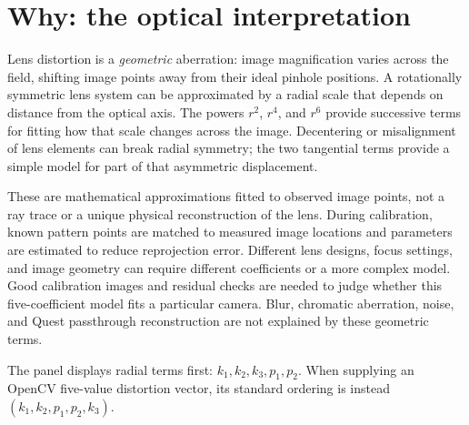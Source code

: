 \documentclass[11pt,a4paper]{article}
\begin{document}
\section{Why: the optical interpretation}
Lens distortion is a \emph{geometric} aberration: image magnification varies
across the field, shifting image points away from their ideal pinhole
positions. A rotationally symmetric lens system can be approximated by a
radial scale that depends on distance from the optical axis. The powers
$r^2$, $r^4$, and $r^6$ provide successive terms for fitting how that scale
changes across the image. Decentering or misalignment of lens elements can
break radial symmetry; the two tangential terms provide a simple model for
part of that asymmetric displacement.

These are mathematical approximations fitted to observed image points, not a
ray trace or a unique physical reconstruction of the lens. During calibration,
known pattern points are matched to measured image locations and parameters are
estimated to reduce reprojection error. Different lens designs, focus settings,
and image geometry can require different coefficients or a more complex model.
Good calibration images and residual checks are needed to judge whether this
five-coefficient model fits a particular camera. Blur, chromatic aberration,
noise, and Quest passthrough reconstruction are not explained by these
geometric terms.

The panel displays radial terms first: $k_1,k_2,k_3,p_1,p_2$. When supplying
an OpenCV five-value distortion vector, its standard ordering is instead
$(k_1,k_2,p_1,p_2,k_3)$.
\end{document}
